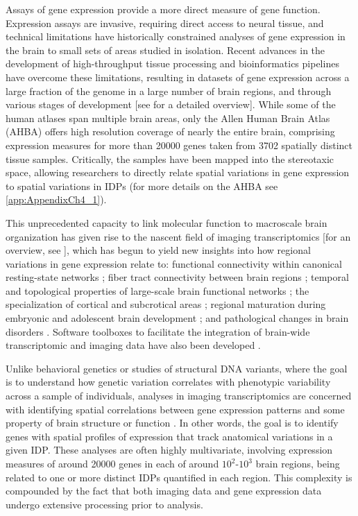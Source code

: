 Assays of gene expression provide a more direct measure of gene function. Expression assays are invasive, requiring direct access to neural tissue, and technical limitations have historically constrained analyses of gene expression in the brain to small sets of areas studied in isolation. Recent advances in the development of high-throughput tissue processing and bioinformatics pipelines have overcome these limitations, resulting in datasets of gene expression across a large fraction of the genome in a large number of brain regions, and through various stages of development [see \citet{Keil2018} for a detailed overview]. While some of the human atlases span multiple brain areas, only the Allen Human Brain Atlas (AHBA) offers high resolution coverage of nearly the entire brain, comprising expression measures for more than \num{20000} genes taken from \num{3702} spatially distinct tissue samples. Critically, the samples have been mapped into the stereotaxic space, allowing researchers to directly relate spatial variations in gene expression to spatial variations in IDPs (for more details on the AHBA see \ref{app:AppendixCh4_1}).

This unprecedented capacity to link molecular function to macroscale brain organization has given rise to the nascent field of imaging transcriptomics [for an overview, see \citep{Fornito2019}], which has begun to yield new insights into how regional variations in gene expression relate to: functional connectivity within canonical resting-state networks \citep{Richiardi2015,Forest2017};
fiber tract connectivity between brain regions \citep{Goel2014};
temporal and topological properties of large-scale brain functional networks \citep{Cioli2014b,Vertes2016b};
the specialization of cortical and subcrotical areas \citep{Krienen2016,Parkes2017,Anderson2018};
regional maturation during embryonic and adolescent brain development \citep{Kirsch2016a,Whitaker2016a};
and pathological changes in brain disorders \citep{Rittman2016,Romme2017,McColgan2018,Romero-Garcia2018a}. Software toolboxes to facilitate the integration of brain-wide transcriptomic and imaging data have also been developed \citep{French2015,Gorgolewski2015,Rizzo2016,Rittman2017}.

Unlike behavioral genetics or studies of structural DNA variants, where the goal is to understand how genetic variation correlates with phenotypic variability across a sample of individuals, analyses in imaging transcriptomics are concerned with identifying spatial correlations between gene expression patterns and some property of brain structure or function \citep{Fornito2019}. In other words, the goal is to identify genes with spatial profiles of expression that track anatomical variations in a given IDP. These analyses are often highly multivariate, involving expression measures of around \num{20000} genes in each of around $10^{2}$-$10^{3}$ brain regions, being related to one or more distinct IDPs quantified in each region. This complexity is compounded by the fact that both imaging data and gene expression data undergo extensive processing prior to analysis.

